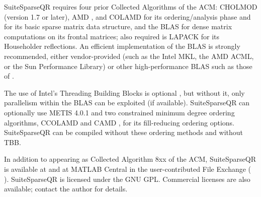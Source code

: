 \documentclass[12pt]{article}
\begin{document}
SuiteSparseQR requires four prior Collected Algorithms of the ACM: CHOLMOD
\cite{ChenDavisHagerRajamanickam09,DavisHager09} (version 1.7 or later), AMD
\cite{AmestoyDavisDuff96,AmestoyDavisDuff03}, and COLAMD
\cite{DavisGilbertLarimoreNg00_algo,DavisGilbertLarimoreNg00} for its
ordering/analysis phase and for its basic sparse matrix data structure, and the
BLAS \cite{dddh:90} for dense matrix computations on its frontal matrices; also
required is LAPACK \cite{LAPACK} for its Householder reflections.  An efficient
implementation of the BLAS is strongly recommended, either vendor-provided
(such as the Intel MKL, the AMD ACML, or the Sun Performance Library) or other
high-performance BLAS such as those of \cite{GotoVanDeGeijn08}.

The use of Intel's Threading Building Blocks is optional \cite{Reinders07}, but
without it, only parallelism within the BLAS can be exploited (if available).
Suite\-SparseQR can optionally use METIS 4.0.1 \cite{KarypisKumar98e} and two
constrained minimum degree ordering algorithms, CCOLAMD and CAMD
\cite{ChenDavisHagerRajamanickam09}, for its fill-reducing ordering options.
SuiteSparseQR can be compiled without these ordering methods and without TBB.

In addition to appearing as Collected Algorithm 8xx of the ACM, SuiteSparseQR
is available at
and at MATLAB Central
in the user-contributed File Exchange (
).
SuiteSparseQR is licensed under the GNU GPL.  Commercial licenses are also
available; contact the author for details.




\end{document}
